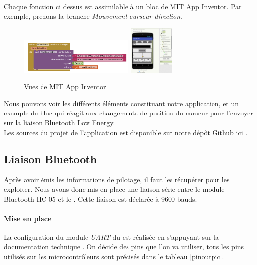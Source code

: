 		\\Chaque fonction ci dessus est assimilable à un bloc de MIT App Inventor. Par exemple, prenons la branche \textit{Mouvement curseur direction}.
		\begin{figure}
			\begin{center}		
				\includegraphics[width=0.5\textwidth]{../Illus/MITBlock.png}
				\includegraphics[width=0.2\textwidth]{../Illus/MITScreen.png}
			\end{center}
			\caption{Vues de MIT App Inventor}
		\end{figure}
		Nous pouvons voir les différents éléments constituant notre application, et un exemple de bloc qui réagit aux changements de position du curseur pour l'envoyer sur la liaison Bluetooth Low Energy.
		\\Les sources du projet de l'application est disponible sur notre dépôt Github ici \cite{git}.
			\subsection{Liaison Bluetooth}
			Après avoir émis les informations de pilotage, il faut les récupérer pour les exploiter. Nous avons donc mis en place une liaison série entre le module Bluetooth HC-05 et le \pic. Cette liaison est déclarée à 9600 bauds.
			\paragraph{Mise en place}La configuration du module \textit{UART} du \pic est réalisée en s'appuyant sur la documentation technique \cite{DatasheetPIC}. On décide des pins que l'on va utiliser, tous les pins utilisés sur les microcontrôleurs sont précisés dans le tableau \ref{pinoutpic}.
			
			
